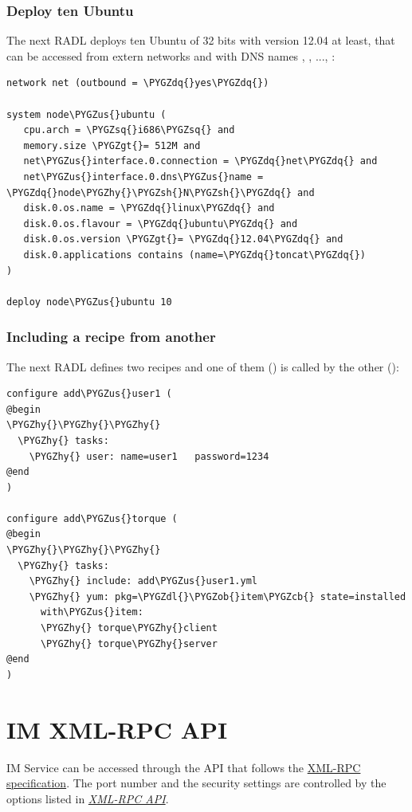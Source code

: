 \documentclass[letterpaper,10pt,english]{sphinxmanual}
\def\PYGZus{\char`\_}
\def\PYGZob{\char`\{}
\def\PYGZcb{\char`\}}
\def\PYGZgt{\char`\>}
\def\PYGZsh{\char`\#}
\def\PYGZdl{\char`\$}
\def\PYGZhy{\char`\-}
\def\PYGZsq{\char`\'}
\def\PYGZdq{\char`\"}
\begin{document}
\subsection{Deploy ten Ubuntu}
\label{radl:deploy-ten-ubuntu}
The next RADL deploys ten Ubuntu of 32 bits with version 12.04 at least, that
can be accessed from extern networks and with DNS names , ,
..., :

\begin{Verbatim}[commandchars=\\\{\}]
network net (outbound = \PYGZdq{}yes\PYGZdq{})

system node\PYGZus{}ubuntu (
   cpu.arch = \PYGZsq{}i686\PYGZsq{} and
   memory.size \PYGZgt{}= 512M and
   net\PYGZus{}interface.0.connection = \PYGZdq{}net\PYGZdq{} and
   net\PYGZus{}interface.0.dns\PYGZus{}name = \PYGZdq{}node\PYGZhy{}\PYGZsh{}N\PYGZsh{}\PYGZdq{} and
   disk.0.os.name = \PYGZdq{}linux\PYGZdq{} and
   disk.0.os.flavour = \PYGZdq{}ubuntu\PYGZdq{} and
   disk.0.os.version \PYGZgt{}= \PYGZdq{}12.04\PYGZdq{} and
   disk.0.applications contains (name=\PYGZdq{}toncat\PYGZdq{})
)

deploy node\PYGZus{}ubuntu 10
\end{Verbatim}


\subsection{Including a recipe from another}
\label{radl:including-a-recipe-from-another}
The next RADL defines two recipes and one of them () is called by
the other ():

\begin{Verbatim}[commandchars=\\\{\}]
configure add\PYGZus{}user1 (
@begin
\PYGZhy{}\PYGZhy{}\PYGZhy{}
  \PYGZhy{} tasks:
    \PYGZhy{} user: name=user1   password=1234
@end
)

configure add\PYGZus{}torque (
@begin
\PYGZhy{}\PYGZhy{}\PYGZhy{}
  \PYGZhy{} tasks:
    \PYGZhy{} include: add\PYGZus{}user1.yml
    \PYGZhy{} yum: pkg=\PYGZdl{}\PYGZob{}item\PYGZcb{} state=installed
      with\PYGZus{}item:
      \PYGZhy{} torque\PYGZhy{}client
      \PYGZhy{} torque\PYGZhy{}server
@end
)
\end{Verbatim}


\chapter{IM XML-RPC API}
\label{xmlrpc:im-xml-rpc-api}\label{xmlrpc::doc}
IM Service can be accessed through the API that
follows the \href{http://xmlrpc.scripting.com/spec}{XML-RPC specification}. The
port number and the security settings are controlled by the options listed in
{\hyperref[manual:options-xmlrpc]{\emph{XML-RPC API}}}.
\end{document}
